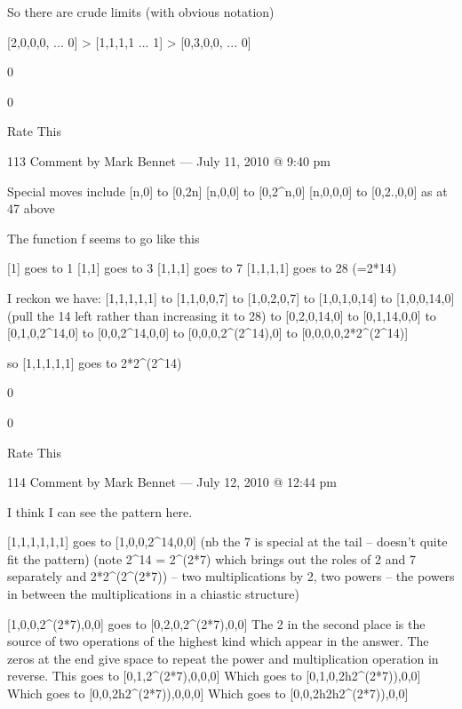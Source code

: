 {            So there are crude limits (with obvious notation)

            [2,0,0,0, ... 0] > [1,1,1,1 ... 1] > [0,3,0,0, ... 0]
             
            0
             
            0
             
            Rate This

            113 Comment by Mark Bennet — July 11, 2010 @ 9:40 pm

        Special moves include
        [n,0] to [0,2n]
        [n,0,0] to [0,2^n,0]
        [n,0,0,0] to [0,2^^n,0,0]
        as at 47 above

        The function f seems to go like this

        [1] goes to 1
        [1,1] goes to 3
        [1,1,1] goes to 7
        [1,1,1,1] goes to 28 (=2*14)

        I reckon we have:
        [1,1,1,1,1] to [1,1,0,0,7] to [1,0,2,0,7] to [1,0,1,0,14] to [1,0,0,14,0] (pull the 14 left rather than increasing it to 28)
        to [0,2,0,14,0] to [0,1,14,0,0] to [0,1,0,2^14,0] to [0,0,2^14,0,0]
        to [0,0,0,2^(2^14),0]
        to [0,0,0,0,2*2^(2^14)]

        so [1,1,1,1,1] goes to 2*2^(2^14)
         
        0
         
        0
         
        Rate This

        114 Comment by Mark Bennet — July 12, 2010 @ 12:44 pm

            I think I can see the pattern here.

            [1,1,1,1,1,1] goes to [1,0,0,2^14,0,0]
            (nb the 7 is special at the tail – doesn’t quite fit the pattern)
            (note 2^14 = 2^(2*7) which brings out the roles of 2 and 7 separately
            and 2*2^(2^(2*7)) – two multiplications by 2, two powers
            – the powers in between the multiplications in a chiastic structure)

            [1,0,0,2^(2*7),0,0] goes to [0,2,0,2^(2*7),0,0]
            The 2 in the second place is the source of two operations of the highest kind which appear in the answer.
            The zeros at the end give space to repeat the power and multiplication operation in reverse.
            This goes to [0,1,2^(2*7),0,0,0]
            Which goes to [0,1,0,2^^(2^(2*7)),0,0]
            Which goes to [0,0,2^^(2^(2*7)),0,0,0]
            Which goes to [0,0,2^^(2^^(2^(2*7)),0,0]

}
